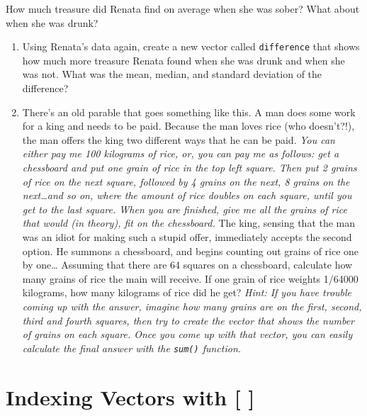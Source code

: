 \documentclass[]{book}
\theoremstyle{definition}
\theoremstyle{definition}
\theoremstyle{remark}
\begin{document}
How much treasure did Renata find on average when she was sober? What
about when she was drunk?

\begin{enumerate}
\def\labelenumi{\arabic{enumi}.}
\setcounter{enumi}{2}
\item
  Using Renata's data again, create a new vector called
  \texttt{difference} that shows how much more treasure Renata found
  when she was drunk and when she was not. What was the mean, median,
  and standard deviation of the difference?
\item
  There's an old parable that goes something like this. A man does some
  work for a king and needs to be paid. Because the man loves rice (who
  doesn't?!), the man offers the king two different ways that he can be
  paid. \emph{You can either pay me 100 kilograms of rice, or, you can
  pay me as follows: get a chessboard and put one grain of rice in the
  top left square. Then put 2 grains of rice on the next square,
  followed by 4 grains on the next, 8 grains on the next\ldots{}and so
  on, where the amount of rice doubles on each square, until you get to
  the last square. When you are finished, give me all the grains of rice
  that would (in theory), fit on the chessboard.} The king, sensing that
  the man was an idiot for making such a stupid offer, immediately
  accepts the second option. He summons a chessboard, and begins
  counting out grains of rice one by one\ldots{} Assuming that there are
  64 squares on a chessboard, calculate how many grains of rice the main
  will receive. If one grain of rice weights 1/64000 kilograms, how many
  kilograms of rice did he get? \emph{Hint: If you have trouble coming
  up with the answer, imagine how many grains are on the first, second,
  third and fourth squares, then try to create the vector that shows the
  number of grains on each square. Once you come up with that vector,
  you can easily calculate the final answer with the \texttt{sum()}
  function.}
\end{enumerate}

\chapter{Indexing Vectors with {[} {]}}\label{vectorindexing}
\end{document}
